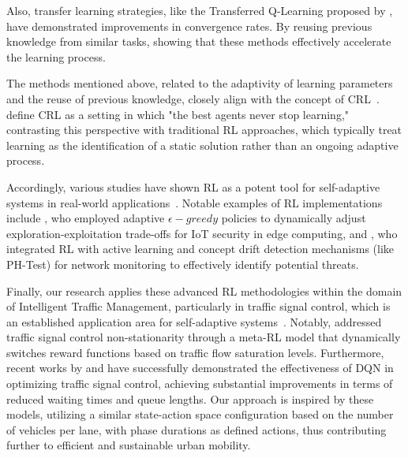 Also, transfer learning strategies, like the Transferred Q-Learning proposed by \citet{chen2022transferredqlearning}, have demonstrated improvements in convergence rates. By reusing previous knowledge from similar tasks, showing that these methods effectively accelerate the learning process.

The methods mentioned above, related to the adaptivity of learning parameters and the reuse of previous knowledge, closely align with the concept of \ac{CRL}~\cite{khetarpal2022continualreinforcementlearningreview}. \citet{abel2023definitioncontinualreinforcementlearning} define \ac{CRL} as a setting in which "the best agents never stop learning," contrasting this perspective with traditional \ac{RL} approaches, which typically treat learning as the identification of a static solution rather than an ongoing adaptive process.

Accordingly, various studies have shown \ac{RL} as a potent tool for self-adaptive systems in real-world applications~\cite{HENRICHS2022106940}. Notable examples of \ac{RL} implementations include \citet{iotdynamicrl}, who employed adaptive $\epsilon-greedy$ policies to dynamically adjust exploration-exploitation trade-offs for IoT security in edge computing, and \citet{networkdynamicrl}, who integrated \ac{RL} with active learning and concept drift detection mechanisms (like PH-Test) for network monitoring to effectively identify potential threats.

Finally, our research applies these advanced \ac{RL} methodologies within the domain of Intelligent Traffic Management, particularly in traffic signal control, which is an established application area for self-adaptive systems~\cite{HENRICHS2022106940}. Notably, \citet{meta-rl-traffic} addressed traffic signal control non-stationarity through a meta-\ac{RL} model that dynamically switches reward functions based on traffic flow saturation levels. Furthermore, recent works by \citet{Swapno2024} and \citet{MORENOMALO2024124178} have successfully demonstrated the effectiveness of \acf{DQN} in optimizing traffic signal control, achieving substantial improvements in terms of reduced waiting times and queue lengths. Our approach is inspired by these models, utilizing a similar state-action space configuration based on the number of vehicles per lane, with phase durations as defined actions, thus contributing further to efficient and sustainable urban mobility.



\endinput

